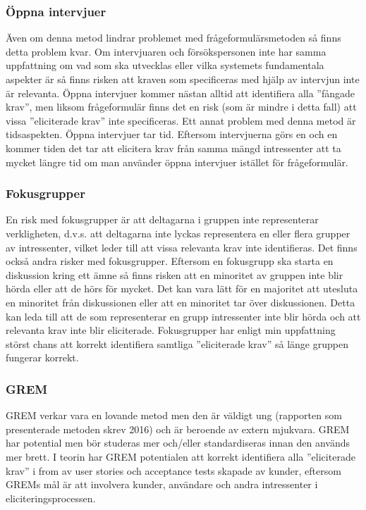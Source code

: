 \subsubsection{Öppna intervjuer}
Även om denna metod lindrar problemet med frågeformulärsmetoden så finns detta problem kvar. Om intervjuaren och försökspersonen inte har samma uppfattning om vad som ska utvecklas eller vilka systemets fundamentala aspekter är så finns risken att kraven som specificeras med hjälp av intervjun inte är relevanta. Öppna intervjuer kommer nästan alltid att identifiera alla ”fångade krav”, men liksom frågeformulär finns det en risk (som är mindre i detta fall) att vissa ”eliciterade krav” inte specificeras. Ett annat problem med denna metod är tidsaspekten. Öppna intervjuer tar tid. Eftersom intervjuerna görs en och en kommer tiden det tar att elicitera krav från samma mängd intressenter att ta mycket längre tid om man använder öppna intervjuer istället för frågeformulär.  

\subsubsection{Fokusgrupper}
En risk med fokusgrupper är att deltagarna i gruppen inte representerar verkligheten, d.v.s. att deltagarna inte lyckas representera en eller flera grupper av intressenter, vilket leder till att vissa relevanta krav inte identifieras. Det finns också andra risker med fokusgrupper. Eftersom en fokusgrupp ska starta en diskussion kring ett ämne så finns risken att en minoritet av gruppen inte blir hörda eller att de hörs för mycket. Det kan vara lätt för en majoritet att utesluta en minoritet från diskussionen eller att en minoritet tar över diskussionen. Detta kan leda till att de som representerar en grupp intressenter inte blir hörda och att relevanta krav inte blir eliciterade. Fokusgrupper har enligt min uppfattning störst chans att korrekt identifiera samtliga ”eliciterade krav” så länge gruppen fungerar korrekt.

\subsubsection{GREM}
GREM verkar vara en lovande metod men den är väldigt ung (rapporten som presenterade metoden skrev 2016) och är beroende av extern mjukvara. GREM har potential men bör studeras mer och/eller standardiseras innan den används mer brett. I teorin har GREM potentialen att korrekt identifiera alla ”eliciterade krav” i from av user stories och acceptance tests skapade av kunder, eftersom GREMs mål är att involvera kunder, användare och andra intressenter i eliciteringsprocessen.

